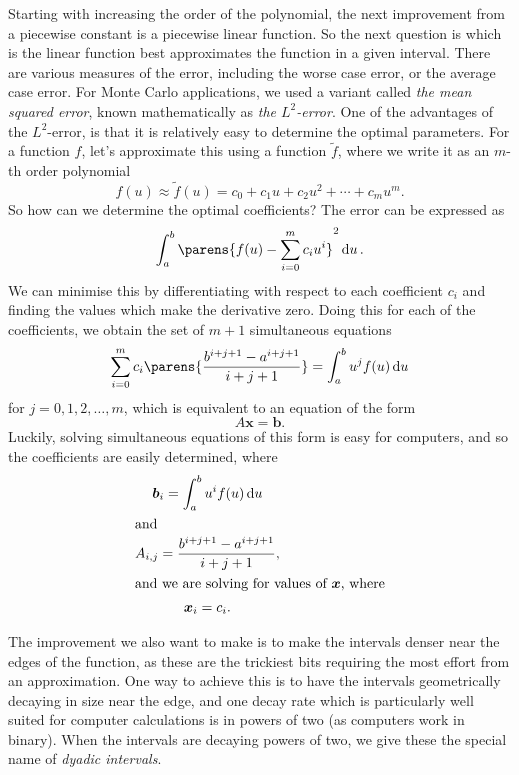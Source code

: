 \documentclass[11pt,a4paper,oneside,english]{extarticle}
\begin{document}
Starting with increasing the order of the polynomial, the next improvement from a piecewise constant is a piecewise linear function. So the next question is which is the linear function best approximates the function in a given interval. There are various measures of the error, including the worse case error, or the average case error. For Monte Carlo applications, we used a variant called \emph{the mean squared error}, known mathematically as \emph{the $ L^2 $-error}. One of the advantages of the $ L^2 $-error, is that it is relatively easy to determine the optimal parameters. For a function $ f $, let's approximate this using a function $ \tilde{f} $, where we write it as an $ m $-th order polynomial  
\begin{equation}
f(u) \approx \tilde{f}(u) = c_0 + c_1 u + c_2 u^2 + \cdots + c_m u^m. 
\end{equation}
So how can we determine the optimal coefficients? The error can be expressed as 
\begin{equation}
\int_{a}^{b} \parens{f(u) - \sum_{i=0}^{m}c_i u^i}^2 \dd{u}.
\end{equation}
We can minimise this by differentiating with respect to each coefficient $ c_i $ and finding the values which make the derivative zero. Doing this for each of the coefficients, we obtain the set of $ m + 1 $ simultaneous equations 
\begin{equation}
\sum_{i=0}^{m} c_i \parens{\dfrac{b^{i+j+1} - a^{i + j + 1}}{i + j + 1}} = \int_{a}^{b} u^j f(u) \dd{u}
\end{equation}
for $ j = 0,1,2,\ldots,m $, which is equivalent to an equation of the form 
\begin{equation}
A\bm{x} = \bm{b}.
\end{equation} 
Luckily, solving simultaneous equations of this form is easy for computers, and so the coefficients are easily determined, where 
\begin{gather}
\bm{b}_i = \int_{a}^{b} u^i f(u) \dd{u} \\
\shortintertext{and}
A_{i,j} = \dfrac{b^{i+j+1} - a^{i + j + 1}}{i + j + 1}, \\
\shortintertext{and we are solving for values of $ \bm{x} $, where}
\bm{x}_i = c_i.
\end{gather}

The improvement we also want to make is to make the intervals denser near the edges of the function, as these are the trickiest bits requiring the most effort from an approximation. One way to achieve this is to have the intervals geometrically decaying in size near the edge, and one decay rate which is particularly well suited for computer calculations is in powers of two (as computers work in binary). When the intervals are decaying powers of two, we give these the special name of \emph{dyadic intervals}.
\end{document}
